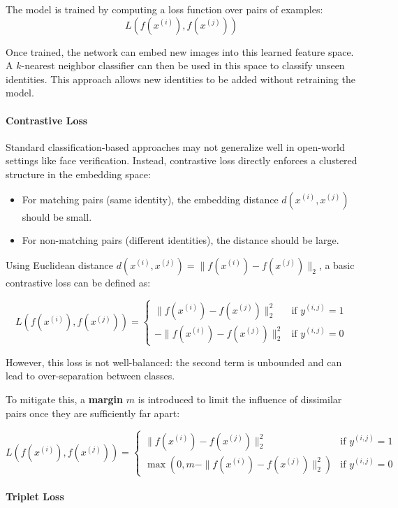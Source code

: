 The model is trained by computing a loss function over pairs of examples:  
$$L(f(x^{(i)}), f(x^{(j)}))$$

Once trained, the network can embed new images into this learned feature space. A $k$-nearest neighbor classifier can then be used in this space to classify unseen identities. This approach allows new identities to be added without retraining the model.

\paragraph{Contrastive Loss}

Standard classification-based approaches may not generalize well in open-world settings like face verification. Instead, contrastive loss directly enforces a clustered structure in the embedding space:

\begin{itemize}
  \item For matching pairs (same identity), the embedding distance $d(x^{(i)}, x^{(j)})$ should be small.
  \item For non-matching pairs (different identities), the distance should be large.
\end{itemize}

Using Euclidean distance $d(x^{(i)}, x^{(j)}) = \|f(x^{(i)}) - f(x^{(j)})\|_2$, a basic contrastive loss can be defined as:

$$
L\left(f(x^{(i)}), f(x^{(j)})\right) = 
\begin{cases}
\|f(x^{(i)}) - f(x^{(j)})\|_2^2 & \text{if } y^{(i,j)} = 1 \\
-\|f(x^{(i)}) - f(x^{(j)})\|_2^2 & \text{if } y^{(i,j)} = 0
\end{cases}
$$

However, this loss is not well-balanced: the second term is unbounded and can lead to over-separation between classes.

To mitigate this, a \textbf{margin} $m$ is introduced to limit the influence of dissimilar pairs once they are sufficiently far apart:

$$
L\left(f(x^{(i)}), f(x^{(j)})\right) = 
\begin{cases}
\|f(x^{(i)}) - f(x^{(j)})\|_2^2 & \text{if } y^{(i,j)} = 1 \\
\max \left(0, m - \|f(x^{(i)}) - f(x^{(j)})\|_2^2 \right) & \text{if } y^{(i,j)} = 0
\end{cases}
$$

\paragraph{Triplet Loss}

